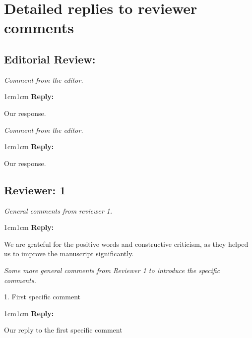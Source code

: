 \documentclass[rightcolwidth=.38]{ugent-note}
\newenvironment{reviewer}{\itshape}{}
\newenvironment{reply}{%
    \begin{adjustwidth}{1cm}{1cm}%
    \color{grayreply}\textbf{Reply:\ }%
    \ignorespaces%
}{\end{adjustwidth}}
\begin{document}
\section*{Detailed replies to reviewer comments}

\subsection*{Editorial Review:}

\begin{minipage}{\linewidth}
    \begin{reviewer}
        Comment from the editor.
    \end{reviewer}

    \begin{reply}
        Our response.
    \end{reply}
\end{minipage}

\begin{minipage}{\linewidth}
    \begin{reviewer}
        Comment from the editor.
    \end{reviewer}

    \begin{reply}
        Our response.
    \end{reply}
\end{minipage}


\subsection*{Reviewer: 1}

\begin{minipage}{\linewidth}
    \begin{reviewer}
        General comments from reviewer 1.
    \end{reviewer}

    \begin{reply}
        We are grateful for the positive words and constructive criticism, as they helped us to improve the manuscript significantly.
    \end{reply}
\end{minipage}


\begin{minipage}{\linewidth}
    \begin{reviewer}
        Some more general comments from Reviewer 1 to introduce the specific comments.

        1. First specific comment
    \end{reviewer}

    \begin{reply}
        Our reply to the first specific comment
    \end{reply}
\end{minipage}
\end{document}
